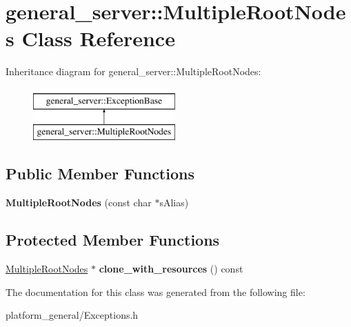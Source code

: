\hypertarget{classgeneral__server_1_1MultipleRootNodes}{\section{general\-\_\-server\-:\-:\-Multiple\-Root\-Nodes \-Class \-Reference}
\label{classgeneral__server_1_1MultipleRootNodes}
}
\-Inheritance diagram for general\-\_\-server\-:\-:\-Multiple\-Root\-Nodes\-:\begin{figure}[H]
\begin{center}
\leavevmode
\includegraphics[height=2.000000cm]{classgeneral__server_1_1MultipleRootNodes}
\end{center}
\end{figure}
\subsection*{\-Public \-Member \-Functions}
\begin{DoxyCompactItemize}
\item 
\hypertarget{classgeneral__server_1_1MultipleRootNodes_a2a61101e59cc1fb3469727315f1e1b21}{{\bfseries \-Multiple\-Root\-Nodes} (const char $\ast$s\-Alias)}\label{classgeneral__server_1_1MultipleRootNodes_a2a61101e59cc1fb3469727315f1e1b21}

\end{DoxyCompactItemize}
\subsection*{\-Protected \-Member \-Functions}
\begin{DoxyCompactItemize}
\item 
\hypertarget{classgeneral__server_1_1MultipleRootNodes_a320462b917571532d3b6f044d96327b4}{\hyperlink{classgeneral__server_1_1MultipleRootNodes}{\-Multiple\-Root\-Nodes} $\ast$ {\bfseries clone\-\_\-with\-\_\-resources} () const }\label{classgeneral__server_1_1MultipleRootNodes_a320462b917571532d3b6f044d96327b4}

\end{DoxyCompactItemize}


\-The documentation for this class was generated from the following file\-:\begin{DoxyCompactItemize}
\item 
platform\-\_\-general/\-Exceptions.\-h\end{DoxyCompactItemize}
